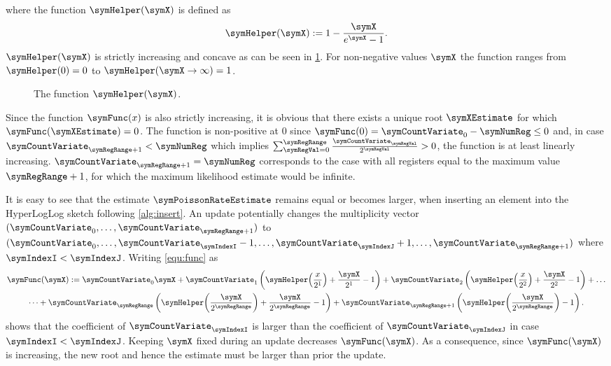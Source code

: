 \documentclass[a4paper]{scrartcl}
\begin{document}
where the function $\symHelper(\symX)$ is defined as
\begin{equation}
\label{equ:helper}
\symHelper(\symX):=1-\frac{\symX}{e^{\symX}-1}.
\end{equation}
$\symHelper(\symX)$ is strictly increasing and concave as can be seen in \cref{fig:helper_function}. For non-negative values $\symX$ the function ranges from $\symHelper(0)=0$ to $\symHelper(\symX\rightarrow \infty)=1$.
\begin{figure}
\centering

\caption{The function $\symHelper(\symX)$.}
\label{fig:helper_function}
\end{figure}
Since the function $\symFunc(x)$ is also strictly increasing, it is obvious that there exists a unique root $\symXEstimate$ for which $\symFunc(\symXEstimate)=0$. The function is non-positive at 0 since $\symFunc(0)=\symCountVariate_0-\symNumReg\leq 0$ and, in case $\symCountVariate_{\symRegRange+1}<\symNumReg$ which implies $\sum_{\symRegVal=0}^\symRegRange \frac{\symCountVariate_\symRegVal}{2^\symRegVal}>0$, the function is at least linearly increasing. $\symCountVariate_{\symRegRange+1}=\symNumReg$ corresponds to the case with all registers equal to the maximum value $\symRegRange+1$, for which the maximum likelihood estimate would be infinite.

It is easy to see that the estimate $\symPoissonRateEstimate$ remains equal or becomes larger, when inserting an element into the HyperLogLog sketch following \cref{alg:insert}. An update potentially changes the multiplicity vector $(\symCountVariate_0,\ldots,\symCountVariate_{\symRegRange+1})$ to $(\symCountVariate_0,\ldots,\symCountVariate_\symIndexI-1,\ldots,\symCountVariate_\symIndexJ+1,\ldots,\symCountVariate_{\symRegRange+1})$ where $\symIndexI < \symIndexJ$. Writing \eqref{equ:func} as 
\begin{multline}
\symFunc(\symX)
:=
\symCountVariate_0 \symX
+
\symCountVariate_1 \left(
\symHelper\!\left(\frac{x}{2^1}\right)
+\frac{\symX}{2^1}-1
\right)
+
\symCountVariate_2 \left(
\symHelper\!\left(\frac{x}{2^2}\right)
+\frac{\symX}{2^2}-1
\right)
+
\ldots
\\
\dots
+
\symCountVariate_\symRegRange
\left(
\symHelper\!\left(\frac{\symX}{2^\symRegRange}\right)
+\frac{\symX}{2^\symRegRange}-1
\right)
+
\symCountVariate_{\symRegRange+1}
\left(
\symHelper\!\left(\frac{\symX}{2^{\symRegRange}}\right)
-1
\right).
\end{multline}
shows that the coefficient of $\symCountVariate_\symIndexI$ is larger than the coefficient of $\symCountVariate_\symIndexJ$ in case $\symIndexI < \symIndexJ$. Keeping $\symX$ fixed during an update decreases $\symFunc(\symX)$. As a consequence, since $\symFunc(\symX)$ is increasing, the new root and hence the estimate must be larger than prior the update.
\end{document}
